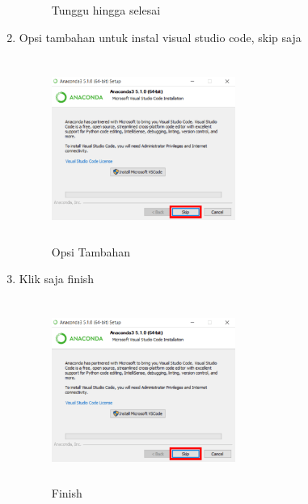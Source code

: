 \begin{enumerate}
\begin{figure}[H]
\caption{Tunggu hingga selesai}
\label{akhir}
\end{figure}
\item Opsi tambahan untuk instal visual studio code, skip saja
\begin{figure}[H]
\centering
\includegraphics[width=6cm,height=6cm]{figures/7.png}
\caption{Opsi Tambahan}
\label{akhir}
\end{figure}
\item Klik saja finish
\begin{figure}[H]
\centering
\includegraphics[width=6cm,height=6cm]{figures/7.png}
\caption{Finish}
\label{akhir}
\end{figure}
\end{enumerate}

